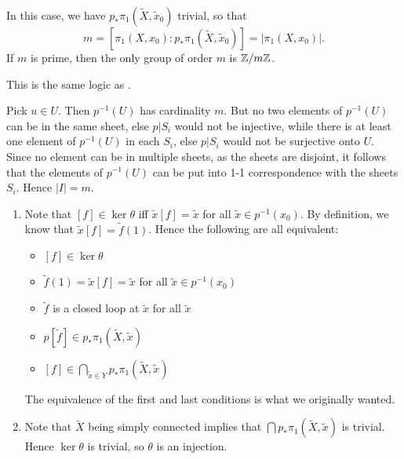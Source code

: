 \documentclass[../../solutions.tex]{subfiles}
\begin{document}
\begin{exercise} \leavevmode
In this case, we have $p_*\pi_1(\widetilde X,\tilde x_0)$ trivial, so that
\[m=[\pi_1(X,x_0):p_*\pi_1(\widetilde X,\tilde x_0)]=|\pi_1(X,x_0)|.\]
If $m$ is prime, then the only group of order $m$ is $\mathbb{Z}/m\mathbb{Z}$.
\end{exercise}

\begin{exercise} \leavevmode
This is the same logic as .
\end{exercise}

\begin{exercise} \leavevmode
Pick $u\in U$.
Then $p^{-1}(U)$ has cardinality $m$.
But no two elements of $p^{-1}(U)$ can be in the same sheet, else $p|S_i$ would not be injective, while there is at least one element of $p^{-1}(U)$ in each $S_i$, else $p|S_i$ would not be surjective onto $U$.
Since no element can be in multiple sheets, as the sheets are disjoint, it follows that the elements of $p^{-1}(U)$ can be put into 1-1 correspondence with the sheets $S_i$.
Hence $|I|=m$.
\end{exercise}

\begin{exercise} \leavevmode
\begin{enumerate}
\item
Note that $[f]\in\ker\theta$ iff $\tilde x[f]=\tilde x$ for all $\tilde x\in p^{-1}(x_0)$.
By definition, we know that $\tilde x[f]=\tilde f(1)$.
Hence the following are all equivalent:
\begin{itemize}
\item $[f]\in\ker\theta$
\item $\tilde f(1)=\tilde x[f]=\tilde x$ for all $\tilde x\in p^{-1}(x_0)$
\item $\tilde f$ is a closed loop at $\tilde x$ for all $\tilde x$
\item $p[\tilde f]\in p_*\pi_1(\widetilde X,\tilde x)$
\item $[f]\in\bigcap_{\tilde x\in Y}p_*\pi_1(\widetilde X,\tilde x)$
\end{itemize}
The equivalence of the first and last conditions is what we originally wanted.

\item
Note that $\widetilde X$ being simply connected implies that $\bigcap p_*\pi_1(\widetilde X,\tilde x)$ is trivial.
Hence $\ker\theta$ is trivial, so $\theta$ is an injection.
\end{enumerate}
\end{exercise}
\end{document}

